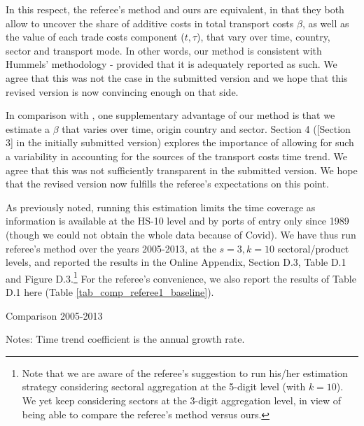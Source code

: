 \documentclass[a4paper,11pt]{article}
\begin{document}
\begin{itemize}
In this respect, the referee's method and ours are equivalent, in that they both allow to uncover the share of additive costs in total transport costs $\beta$, as well as the value of each trade costs component ($t,\tau$), that vary over time, country, sector and transport mode. In other words, our method is consistent with Hummels' methodology - provided that it is adequately reported as such. We agree that this was not the case in the submitted version and we hope that this revised version is now convincing enough on that side.

In comparison with \cite{hummels2007}, one supplementary advantage of our method is that we estimate a $\beta$ that varies over time, origin country and sector. Section 4 ([Section 3] in the initially submitted version) explores the importance of allowing for such a variability in accounting for the sources of the transport costs time trend. We agree that this was not sufficiently transparent in the submitted version. We hope that the revised version now fulfills the referee's expectations on this point.

\end{itemize}

As previously noted, running this estimation limits the time coverage as information is available at the HS-10 level and by ports of entry only since 1989 (though we could not obtain the whole data because of Covid). We have thus run referee's method over the years 2005-2013, at the $s=3, k=10$ sectoral/product levels, and reported the results in the Online Appendix, Section D.3, Table D.1 and Figure D.3.\footnote{Note that we are aware of the referee's suggestion to run his/her estimation strategy considering sectoral aggregation at the 5-digit level (with $k=10$). We yet keep considering sectors at the 3-digit aggregation level, in view of being able to compare the referee's method versus ours.} For the referee's convenience, we also report the results of Table D.1 here (Table \ref{tab_comp_referee1_baseline}).

\begin{table}[htbp]
	\caption{Comparison 2005-2013}
	\begin{center}		
		
	
{\parbox[l]{12cm}{ \vspace{4pt}\footnotesize{Notes: Time trend coefficient is the annual growth rate.}}}
\end{center}
	\label{tab_comp_referee1_baseline}%
\end{table}%
\end{document}
